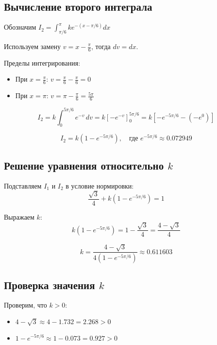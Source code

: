 \documentclass[12pt,a4paper]{article}
\begin{document}
\subsection*{Вычисление второго интеграла}

Обозначим $I_2 = \displaystyle\int_{\pi/6}^{\pi} ke^{-(x-\pi/6)}dx$

Используем замену $v = x - \frac{\pi}{6}$, тогда $dv = dx$.

Пределы интегрирования:
\begin{itemize}
    \item При $x = \frac{\pi}{6}$: $v = \frac{\pi}{6} - \frac{\pi}{6} = 0$
    \item При $x = \pi$: $v = \pi - \frac{\pi}{6} = \frac{5\pi}{6}$
\end{itemize}

\begin{equation}
I_2 = k\int_{0}^{5\pi/6} e^{-v}\,dv = k\left[-e^{-v}\right]_{0}^{5\pi/6} = k\left[-e^{-5\pi/6} - (-e^{0})\right]
\end{equation}

\begin{equation}
I_2 = k\left(1 - e^{-5\pi/6}\right), \quad \text{где } e^{-5\pi/6} \approx 0.072949
\end{equation}

\subsection*{Решение уравнения относительно $k$}

Подставляем $I_1$ и $I_2$ в условие нормировки:
\begin{equation}
\frac{\sqrt{3}}{4} + k\left(1 - e^{-5\pi/6}\right) = 1
\end{equation}

Выражаем $k$:
\begin{equation}
k\left(1 - e^{-5\pi/6}\right) = 1 - \frac{\sqrt{3}}{4} = \frac{4-\sqrt{3}}{4}
\end{equation}

\begin{equation}
k = \frac{4-\sqrt{3}}{4\left(1 - e^{-5\pi/6}\right)} \approx 0.611603
\end{equation}

\subsection*{Проверка значения $k$}

Проверим, что $k > 0$:
\begin{itemize}
    \item $4 - \sqrt{3} \approx 4 - 1.732 = 2.268 > 0$
    \item $1 - e^{-5\pi/6} \approx 1 - 0.073 = 0.927 > 0$
\end{itemize}
\end{document}
